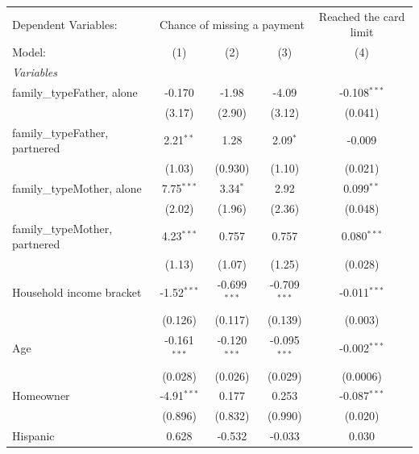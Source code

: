
\begingroup
\centering
\begin{tabular}{lcccc}
   \tabularnewline \midrule \midrule
   Dependent Variables: & \multicolumn{3}{c}{Chance of missing a payment} & Reached the card limit\\
   Model:                         & (1)            & (2)            & (3)            & (4)\\  
   \midrule
   \emph{Variables}\\
   family\_typeFather, alone      & -0.170         & -1.98          & -4.09          & -0.108$^{***}$\\   
                                  & (3.17)         & (2.90)         & (3.12)         & (0.041)\\   
   family\_typeFather, partnered  & 2.21$^{**}$    & 1.28           & 2.09$^{*}$     & -0.009\\   
                                  & (1.03)         & (0.930)        & (1.10)         & (0.021)\\   
   family\_typeMother, alone      & 7.75$^{***}$   & 3.34$^{*}$     & 2.92           & 0.099$^{**}$\\   
                                  & (2.02)         & (1.96)         & (2.36)         & (0.048)\\   
   family\_typeMother, partnered  & 4.23$^{***}$   & 0.757          & 0.757          & 0.080$^{***}$\\   
                                  & (1.13)         & (1.07)         & (1.25)         & (0.028)\\   
   Household income bracket       & -1.52$^{***}$  & -0.699$^{***}$ & -0.709$^{***}$ & -0.011$^{***}$\\   
                                  & (0.126)        & (0.117)        & (0.139)        & (0.003)\\   
   Age                            & -0.161$^{***}$ & -0.120$^{***}$ & -0.095$^{***}$ & -0.002$^{***}$\\   
                                  & (0.028)        & (0.026)        & (0.029)        & (0.0006)\\   
   Homeowner                      & -4.91$^{***}$  & 0.177          & 0.253          & -0.087$^{***}$\\   
                                  & (0.896)        & (0.832)        & (0.990)        & (0.020)\\   
   Hispanic                       & 0.628          & -0.532         & -0.033         & 0.030\\   

\end{tabular}
